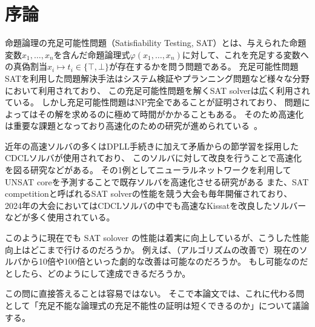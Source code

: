 \section{序論}
命題論理の充足可能性問題（Satisfiability Testing, SAT）とは、与えられた命題変数\( x_1,\dots,x_n \)を含んだ命題論理式\( \varphi(x_1,\dots,x_n) \)に対して、これを充足する変数への真偽割当\( x_i \mapsto t_i \in \{ \top, \bot \} \)が存在するかを問う問題である。
充足可能性問題SATを利用した問題解決手法はシステム検証やプランニング問題など様々な分野において利用されており、
この充足可能性問題を解くSAT solverは広く利用されている。
しかし充足可能性問題はNP完全であることが証明されており、
問題によってはその解を求めるのに極めて時間がかかることもある。
そのため高速化は重要な課題となっており高速化のための研究が進められている~\cite{solover1,solover2,solver3,MINISAT,kissat,neuralnet-vs-random-VSIDS}。

近年の高速ソルバの多くはDPLL手続きに加えて矛盾からの節学習を採用したCDCLソルバが使用されており、
このソルバに対して改良を行うことで高速化を図る研究などがある。
その1例としてニューラルネットワークを利用してUNSAT coreを予測することで既存ソルバを高速化させる研究がある
また、SAT competitionと呼ばれるSAT solverの性能を競う大会も毎年開催されており、
2024年の大会においてはCDCLソルバの中でも高速なKissatを改良したソルバーなどが多く使用されている。%

このように現在でも SAT solover の性能は着実に向上しているが、こうした性能向上はどこまで行けるのだろうか。
例えば、（アルゴリズムの改善で）現在のソルバから10倍や100倍といった劇的な改善は可能なのだろうか。
もし可能なのだとしたら、どのようにして達成できるだろうか。



この問に直接答えることは容易ではない。
%
%
そこで本論文では、これに代わる問として「充足不能な論理式の充足不能性の証明は短くできるのか」について議論する。

